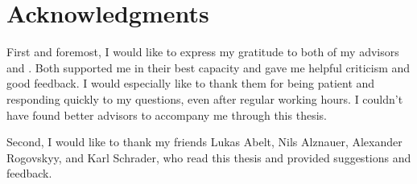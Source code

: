 
\bigskip

\begingroup
\let\clearpage\relax
\let\cleardoublepage\relax
\let\cleardoublepage\relax
\chapter*{Acknowledgments}
First and foremost, I would like to express my gratitude to both of my advisors {\myAdvisor} and {\myOtherAdvisor}. 
Both supported me in their best capacity and gave me helpful criticism and good feedback. 
I would especially like to thank them for being patient and responding quickly to my questions, even after regular working hours.
I couldn't have found better advisors to accompany me through this thesis.

Second, I would like to thank my friends Lukas Abelt, Nils Alznauer, Alexander Rogovskyy, and Karl Schrader,
who read this thesis and provided suggestions and feedback.



\bigskip

\endgroup
